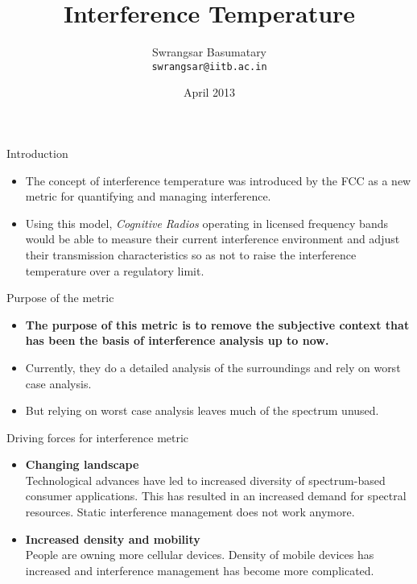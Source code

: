 \documentclass[mathserif]{beamer}
\title{Interference Temperature}
\author{Swrangsar Basumatary \\
\texttt{swrangsar@iitb.ac.in}}
\institute{Indian Institute of Technology Bombay}
\date{April 2013}
\begin{document}
    \frame{\titlepage}

\begin{frame}{Introduction}

\begin{itemize}
	\pause
	\item The concept of interference temperature was introduced by the FCC as a new metric for quantifying and managing interference.
	\pause
	\item Using this model, \emph{Cognitive Radios} operating in licensed frequency bands would be able to measure their current interference environment and adjust their transmission characteristics so as not to raise the interference temperature over a regulatory limit.
\end{itemize}


\end{frame}

\begin{frame}{Purpose of the metric}

\begin{itemize}
	\pause 
	\item \textbf{The purpose of this metric is to remove the subjective context that has been the basis of interference analysis up to now.}
	\pause
	\item Currently, they do a  detailed analysis of the surroundings and rely on worst case analysis.
	
	
	\item But relying on worst case analysis leaves much of the spectrum unused. 
\end{itemize}

\end{frame}

\begin{frame}{Driving forces for interference metric}

\begin{itemize}
\pause
\item \textbf{Changing landscape} \\

Technological advances have led to increased diversity of spectrum-based consumer applications. This has resulted in an increased demand for spectral resources. Static interference management does not work anymore.

\pause
\item \textbf{Increased density and mobility} \\

People are owning more cellular devices. Density of mobile devices has increased and interference management has become more complicated.

\end{itemize}

\end{frame}
\end{document}
